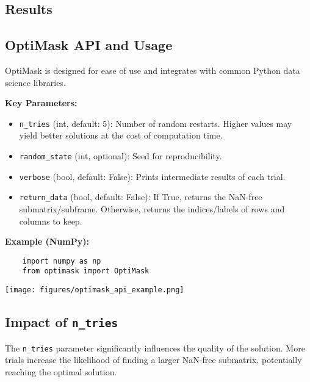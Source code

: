 \documentclass[a0,landscape]{a0poster}
\begin{document}
\begin{multicols}{4}

	\section*{Results}
	\subsection*{OptiMask API and Usage}
	OptiMask is designed for ease of use and integrates with common Python data science libraries.

	\textbf{Key Parameters:}
	\begin{itemize}
		\item \texttt{n\_tries} (int, default: 5): Number of random restarts. Higher values may yield better solutions at the cost of computation time.
		\item \texttt{random\_state} (int, optional): Seed for reproducibility.
		\item \texttt{verbose} (bool, default: False): Prints intermediate results of each trial.
		\item \texttt{return\_data} (bool, default: False): If True, returns the NaN-free submatrix/subframe. Otherwise, returns the indices/labels of rows and columns to keep.
	\end{itemize}

	\textbf{Example (NumPy):}
	\begin{verbatim}
    import numpy as np
    from optimask import OptiMask
	\end{verbatim}

	\begin{center}\vspace{0.5cm}
		\texttt{[image: figures/optimask\_api\_example.png]} %
		\label{fig:api_example}
	\end{center}\vspace{0.5cm}

	\subsection*{Impact of \texttt{n\_tries}}
	The \texttt{n\_tries} parameter significantly influences the quality of the solution. More trials increase the likelihood of finding a larger NaN-free submatrix, potentially reaching the optimal solution.


\end{multicols}
\end{document}
